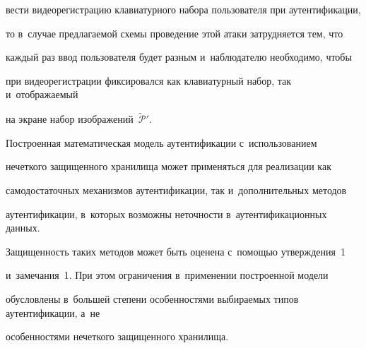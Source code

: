 вести видеорегистрацию клавиатурного набора пользователя при аутентификации, 


то в~случае предлагаемой схемы проведение этой атаки затрудняется тем, что 


каждый раз ввод пользователя будет разным и~наблюдателю необходимо, чтобы 


при видеорегистрации фиксировался как клавиатурный набор, так и~отображаемый 


на экране набор изображений~$\widetilde{\mathcal{P}}'$.





Построенная математическая модель аутентификации с~использованием 


нечеткого защищенного хранилища может применяться для реализации как 


самодостаточных механизмов аутентификации, так и~дополнительных методов 


аутентификации, в~которых возможны неточности в~аутентификационных данных. 


Защищенность таких методов может быть оценена с~помощью утверждения~1 


и~замечания~1. При этом ограничения в~применении построенной модели 


обусловлены в~большей степени особенностями выбираемых типов аутентификации, а~не 


особенностями нечеткого защищенного хранилища.





